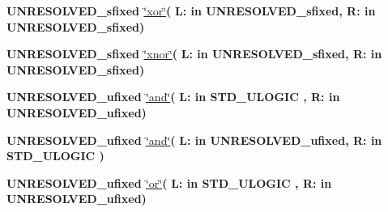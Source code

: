 \begin{DoxyCompactItemize}
{\bfseries {\bfseries \textcolor{vhdlchar}{U\+N\+R\+E\+S\+O\+L\+V\+E\+D\+\_\+sfixed}\textcolor{vhdlchar}{ }}} \hyperlink{class__fixed__pkg_a65771cfcb711b82a634bb11532b42ed2}{\char`\"{}xor\char`\"{}}{\bfseries  ( }{\bfseries \textcolor{vhdlchar}{L\+: }\textcolor{stringliteral}{in }\textcolor{vhdlchar}{U\+N\+R\+E\+S\+O\+L\+V\+E\+D\+\_\+sfixed}}{\bfseries  , \textcolor{vhdlchar}{R\+: }\textcolor{stringliteral}{in }\textcolor{vhdlchar}{U\+N\+R\+E\+S\+O\+L\+V\+E\+D\+\_\+sfixed}}{\bfseries  )} 
\item 
{\bfseries {\bfseries \textcolor{vhdlchar}{U\+N\+R\+E\+S\+O\+L\+V\+E\+D\+\_\+sfixed}\textcolor{vhdlchar}{ }}} \hyperlink{class__fixed__pkg_ab25f2a15b05ea72f6e17c4a8dc952642}{\char`\"{}xnor\char`\"{}}{\bfseries  ( }{\bfseries \textcolor{vhdlchar}{L\+: }\textcolor{stringliteral}{in }\textcolor{vhdlchar}{U\+N\+R\+E\+S\+O\+L\+V\+E\+D\+\_\+sfixed}}{\bfseries  , \textcolor{vhdlchar}{R\+: }\textcolor{stringliteral}{in }\textcolor{vhdlchar}{U\+N\+R\+E\+S\+O\+L\+V\+E\+D\+\_\+sfixed}}{\bfseries  )} 
\item 
{\bfseries {\bfseries \textcolor{vhdlchar}{U\+N\+R\+E\+S\+O\+L\+V\+E\+D\+\_\+ufixed}\textcolor{vhdlchar}{ }}} \hyperlink{class__fixed__pkg_a05c9ff72fee5262cef5cc1c4961f6879}{\char`\"{}and\char`\"{}}{\bfseries  ( }{\bfseries \textcolor{vhdlchar}{L\+: }\textcolor{stringliteral}{in }{\bfseries \textcolor{comment}{S\+T\+D\+\_\+\+U\+L\+O\+G\+I\+C}\textcolor{vhdlchar}{ }}}{\bfseries  , \textcolor{vhdlchar}{R\+: }\textcolor{stringliteral}{in }\textcolor{vhdlchar}{U\+N\+R\+E\+S\+O\+L\+V\+E\+D\+\_\+ufixed}}{\bfseries  )} 
\item 
{\bfseries {\bfseries \textcolor{vhdlchar}{U\+N\+R\+E\+S\+O\+L\+V\+E\+D\+\_\+ufixed}\textcolor{vhdlchar}{ }}} \hyperlink{class__fixed__pkg_a05c9ff72fee5262cef5cc1c4961f6879}{\char`\"{}and\char`\"{}}{\bfseries  ( }{\bfseries \textcolor{vhdlchar}{L\+: }\textcolor{stringliteral}{in }\textcolor{vhdlchar}{U\+N\+R\+E\+S\+O\+L\+V\+E\+D\+\_\+ufixed}}{\bfseries  , \textcolor{vhdlchar}{R\+: }\textcolor{stringliteral}{in }{\bfseries \textcolor{comment}{S\+T\+D\+\_\+\+U\+L\+O\+G\+I\+C}\textcolor{vhdlchar}{ }}}{\bfseries  )} 
\item 
{\bfseries {\bfseries \textcolor{vhdlchar}{U\+N\+R\+E\+S\+O\+L\+V\+E\+D\+\_\+ufixed}\textcolor{vhdlchar}{ }}} \hyperlink{class__fixed__pkg_a7478113186ff6e837bec25be51e9189d}{\char`\"{}or\char`\"{}}{\bfseries  ( }{\bfseries \textcolor{vhdlchar}{L\+: }\textcolor{stringliteral}{in }{\bfseries \textcolor{comment}{S\+T\+D\+\_\+\+U\+L\+O\+G\+I\+C}\textcolor{vhdlchar}{ }}}{\bfseries  , \textcolor{vhdlchar}{R\+: }\textcolor{stringliteral}{in }\textcolor{vhdlchar}{U\+N\+R\+E\+S\+O\+L\+V\+E\+D\+\_\+ufixed}}{\bfseries  )} 

\end{DoxyCompactItemize}
